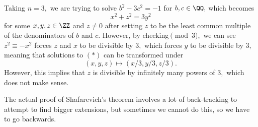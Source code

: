 \begin{example}
	Taking $n=3,$ we are trying to solve $b^2-3c^2=-1$ for $b,c\in\QQ,$ which becomes
	\[x^2+z^2=3y^2\tag{$*$}\]
	for some $x,y,z\in\ZZ$ and $z\ne0$ after setting $z$ to be the least common multiple of the denominators of $b$ and $c.$ However, by checking$\pmod3,$ we can see $z^2\equiv-x^2$ forces $z$ and $x$ to be divisible by $3,$ which forces $y$ to be divisible by $3,$ meaning that solutions to $(*)$ can be transformed under
	\[(x,y,z)\mapsto(x/3,y/3,z/3).\]
	However, this implies that $z$ is divisible by infinitely many powers of $3,$ which does not make sense.
\end{example}
\begin{remark}
	The actual proof of {Shafarevich}'s theorem involves a lot of back-tracking to attempt to find bigger extensions, but sometimes we cannot do this, so we have to go backwards.
\end{remark}

